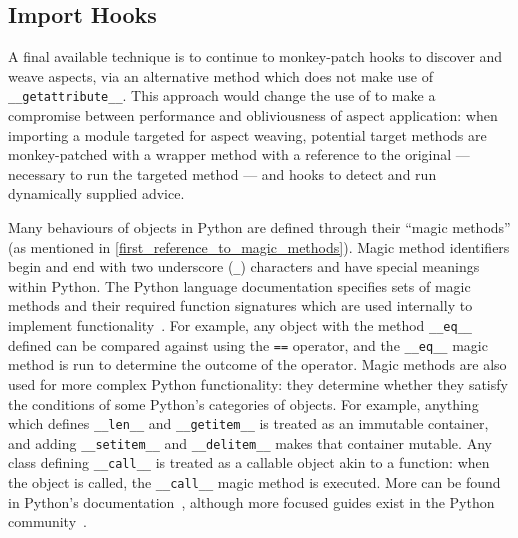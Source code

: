 \subsection{Import Hooks}\label{subsec:pdsf3importhookdiscussion}

A final available technique is to continue to monkey-patch hooks to discover and
weave aspects, via an alternative method which does not make use of
\lstinline{__getattribute__}. This approach would change the use of \pdsfthree{}
to make a compromise between performance and obliviousness of aspect
application: when importing a module targeted for aspect weaving, potential
target methods are monkey-patched with a wrapper method with a reference to the
original --- necessary to run the targeted method --- and hooks to detect and
run dynamically supplied advice.

Many behaviours of objects in Python are defined through their ``magic
methods'' (as mentioned in \cref{first_reference_to_magic_methods}). Magic method
identifiers begin and end with two underscore (\lstinline{_}) characters and
have special meanings within Python. The Python language documentation specifies
sets of magic methods and their required function signatures which are used
internally to implement functionality~\cite{py3docs}. For example, any object
with the method \lstinline{__eq__} defined can be compared against using the
\lstinline{==} operator, and the \lstinline{__eq__} magic method is run to
determine the outcome of the operator. Magic methods are also used for more
complex Python functionality: they determine whether they satisfy the conditions
of some Python's categories of objects. For example, anything which defines
\lstinline{__len__} and \lstinline{__getitem__} is treated as an immutable
container, and adding \lstinline{__setitem__} and \lstinline{__delitem__} makes
that container mutable. Any class defining \lstinline{__call__} is treated as a
callable object akin to a function: when the object is called, the
\lstinline{__call__} magic method is executed. More can be found in Python's
documentation~\cite{py3docs}, although more focused guides exist in the Python
community~\cite{magicmethodguide}.

